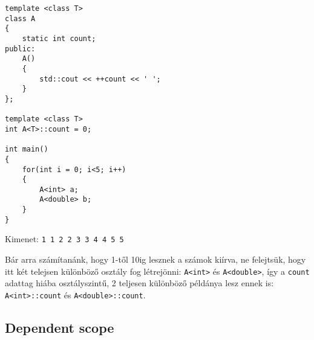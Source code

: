 \documentclass[a4paper,11.5pt,table]{article}
\begin{document}
	\begin{lstlisting}
template <class T>
class A
{
	static int count;
public:
	A()
	{
		std::cout << ++count << ' ';
	}
};

template <class T>
int A<T>::count = 0;

int main() 
{
	for(int i = 0; i<5; i++)
	{
		A<int> a;
		A<double> b;
	}
}
	\end{lstlisting}
	Kimenet: \texttt{1 1 2 2 3 3 4 4 5 5}
	
	Bár arra számítanánk, hogy 1-től 10ig lesznek a számok kiírva, ne felejtsük, hogy itt két telejsen különböző osztály fog létrejönni: \texttt{A<int>} és \texttt{A<double>}, így a \texttt{count} adattag hiába osztályszintű, 2 teljesen különböző példánya lesz ennek is: \texttt{A<int>::count} és \texttt{A<double>::count}.
	
	\subsection{Dependent scope}
	
\end{document}
